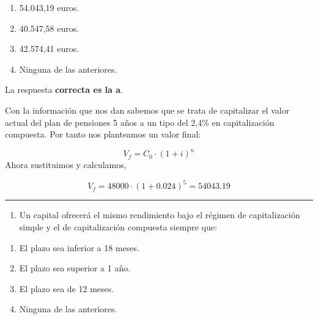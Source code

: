 \documentclass[
  letterpaper,
  DIV=11,
  numbers=noendperiod]{scrreprt}
\providecommand{\tightlist}{%
  \setlength{\itemsep}{0pt}\setlength{\parskip}{0pt}}\usepackage{longtable,booktabs,array}
\begin{document}
\begin{enumerate}
\def\labelenumi{\alph{enumi})}
\item
  54.043,19 euros.
\item
  40.547,58 euros.
\item
  42.574,41 euros.
\item
  Ninguna de las anteriores.
\end{enumerate}

\begin{tcolorbox}[enhanced jigsaw, left=2mm, opacityback=0, colback=white, breakable, arc=.35mm, bottomrule=.15mm, rightrule=.15mm, toprule=.15mm, leftrule=.75mm, colframe=quarto-callout-tip-color-frame]
\begin{minipage}[t]{5.5mm}
\textcolor{quarto-callout-tip-color}{\faLightbulb}
\end{minipage}%
\begin{minipage}[t]{\textwidth - 5.5mm}

La respuesta \textbf{correcta es la a}.

Con la información que nos dan sabemos que se trata de capitalizar el
valor actual del plan de pensiones 5 años a un tipo del 2,4\% en
capitalización compuesta. Por tanto nos planteamos un valor final:

\[V_f=C_0\cdot\left(1+i\right)^n\] Ahora sustituimos y calculamos,

\[V_f=48000\cdot\left(1+0.024\right)^5=54043.19\]

\end{minipage}%
\end{tcolorbox}

\begin{center}\rule{0.5\linewidth}{0.5pt}\end{center}

\begin{enumerate}
\def\labelenumi{\arabic{enumi}.}
\setcounter{enumi}{32}
\tightlist
\item
  Un capital ofrecerá el mismo rendimiento bajo el régimen de
  capitalización simple y el de capitalización compuesta siempre que:
\end{enumerate}

\begin{enumerate}
\def\labelenumi{\alph{enumi})}
\item
  El plazo sea inferior a 18 meses.
\item
  El plazo sea superior a 1 año.
\item
  El plazo sea de 12 meses.
\item
  Ninguna de las anteriores.
\end{enumerate}
\end{document}
